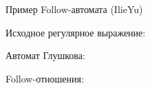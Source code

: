 \begin{frame}{Пример Follow-автомата (IlieYu)} {\vspace{-5pt}}
  \vspace{-5pt}
   {
    Исходное регулярное выражение:

  }
   {
    Автомат Глушкова:

  }
   {
    Follow-отношения:
  }
\end{frame}